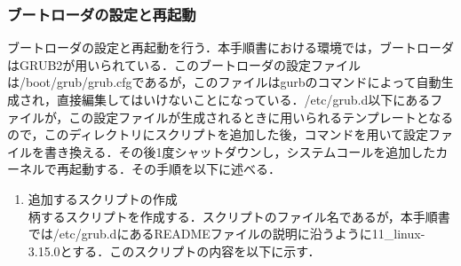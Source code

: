 \documentclass[12pt]{jsarticle}
\begin{document}
\subsubsection{ブートローダの設定と再起動}
ブートローダの設定と再起動を行う．本手順書における環境では，ブートローダはGRUB2が用いられている．このブートローダの設定ファイルは/boot/grub/grub.cfgであるが，このファイルはgurbのコマンドによって自動生成され，直接編集してはいけないことになっている．/etc/grub.d以下にあるファイルが，この設定ファイルが生成されるときに用いられるテンプレートとなるので，このディレクトリにスクリプトを追加した後，コマンドを用いて設定ファイルを書き換える．その後1度シャットダウンし，システムコールを追加したカーネルで再起動する．その手順を以下に述べる．
\begin{enumerate}
  \item 追加するスクリプトの作成\\
    柄するスクリプトを作成する．スクリプトのファイル名であるが，本手順書では/etc/grub.dにあるREADMEファイルの説明に沿うように11\_linux-3.15.0とする．このスクリプトの内容を以下に示す．\\
    

\end{enumerate}
\end{document}
